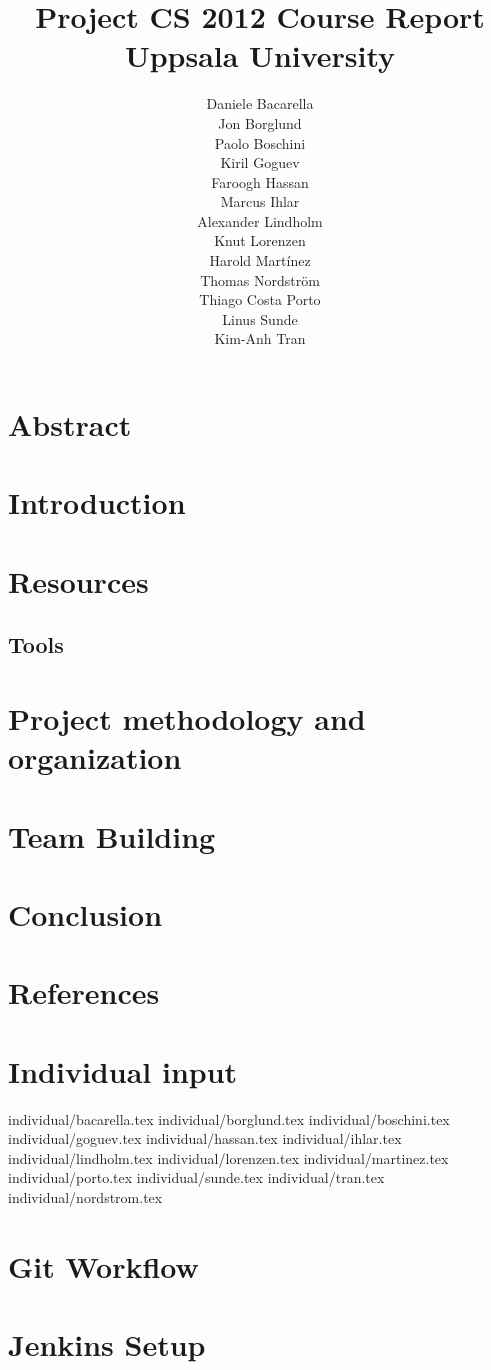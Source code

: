 \documentclass[11pt]{report}
\title{Project CS 2012 Course Report\\Uppsala University\\}
\author{Daniele Bacarella\\
		Jon Borglund\\
		Paolo Boschini\\
		Kiril Goguev\\
		Faroogh Hassan\\
		Marcus Ihlar\\
		Alexander Lindholm\\
		Knut Lorenzen\\
		Harold Mart\'{i}nez\\
		Thomas Nordstr\"om\\
		Thiago Costa Porto\\
		Linus Sunde\\
		Kim-Anh Tran
}
\date{}
\begin{document}
\maketitle

\tableofcontents

\chapter{Abstract}


\chapter{Introduction}

\chapter{Resources}





\section{Tools}
\label{sec:tools}




\chapter{Project methodology and organization}




\chapter{Team Building}

\chapter{Conclusion}

\chapter{References}

\appendix
\chapter{Individual input}

 {individual/bacarella.tex}
 {individual/borglund.tex}
 {individual/boschini.tex}
 {individual/goguev.tex}
 {individual/hassan.tex}
 {individual/ihlar.tex}
 {individual/lindholm.tex}
 {individual/lorenzen.tex}
 {individual/martinez.tex}
 {individual/porto.tex}
 {individual/sunde.tex}
 {individual/tran.tex}
 {individual/nordstrom.tex}

\chapter{Git Workflow}

\chapter{Jenkins Setup}

\end{document}

